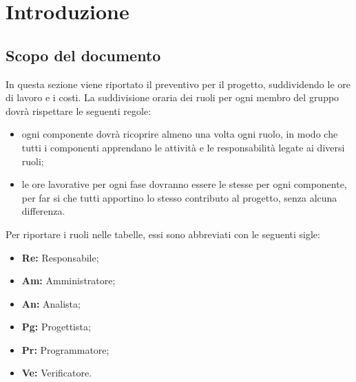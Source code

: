 \section{Introduzione}\label{section:introduzione}

\subsection{Scopo del documento}
In questa sezione viene riportato il preventivo per il progetto, suddividendo le ore di lavoro e i costi.
La suddivisione oraria dei ruoli per ogni membro del gruppo dovrà rispettare le seguenti regole:
\begin{itemize}
	\item ogni componente dovrà ricoprire almeno una volta ogni ruolo, in modo che tutti i componenti apprendano le attività e le responsabilità legate ai diversi ruoli;
	\item le ore lavorative per ogni fase dovranno essere le stesse per ogni componente, per far si che tutti apportino lo stesso contributo al progetto, senza alcuna differenza.
\end{itemize}
Per riportare i ruoli nelle tabelle, essi sono abbreviati con le seguenti sigle:
\begin{itemize}
	\item\textbf{Re:} Responsabile;
	\item\textbf{Am:} Amministratore;
	\item\textbf{An:} Analista;
	\item\textbf{Pg:} Progettista;
	\item\textbf{Pr:} Programmatore;
	\item\textbf{Ve:} Verificatore.
\end{itemize}



